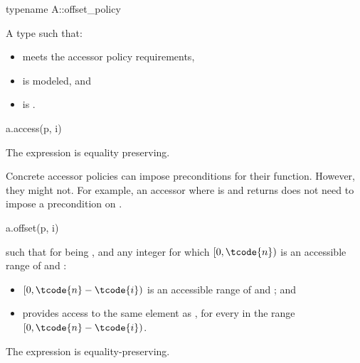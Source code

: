 \begin{itemdecl}
typename A::offset_policy
\end{itemdecl}

\begin{itemdescr}
\pnum
\result
A type  such that:

\begin{itemize}
\item
{} meets the accessor policy requirements,
\item
{} is modeled, and
\item
{} is .
\end{itemize}
\end{itemdescr}

\begin{itemdecl}
a.access(p, i)
\end{itemdecl}

\begin{itemdescr}
\pnum
\result
{}

\pnum
\remarks
The expression is equality preserving.

\pnum
\begin{note}
Concrete accessor policies can impose preconditions for their  function.
However, they might not.
For example, an accessor where
 is  and
 returns 
does not need to impose a precondition on .
\end{note}
\end{itemdescr}

\begin{itemdecl}
a.offset(p, i)
\end{itemdecl}

\begin{itemdescr}
\pnum
\result
{}

\pnum
\returns
{} such that for  being , and
any integer  for which $[0, \tcode{n})$ is
an accessible range of  and :
\begin{itemize}
\item
$[0, \tcode{n} - \tcode{i})$ is an accessible range of  and ; and
\item
{} provides access to
the same element as ,
for every  in the range $[0, \tcode{n} - \tcode{i})$.
\end{itemize}

\pnum
\remarks
The expression is equality-preserving.
\end{itemdescr}

